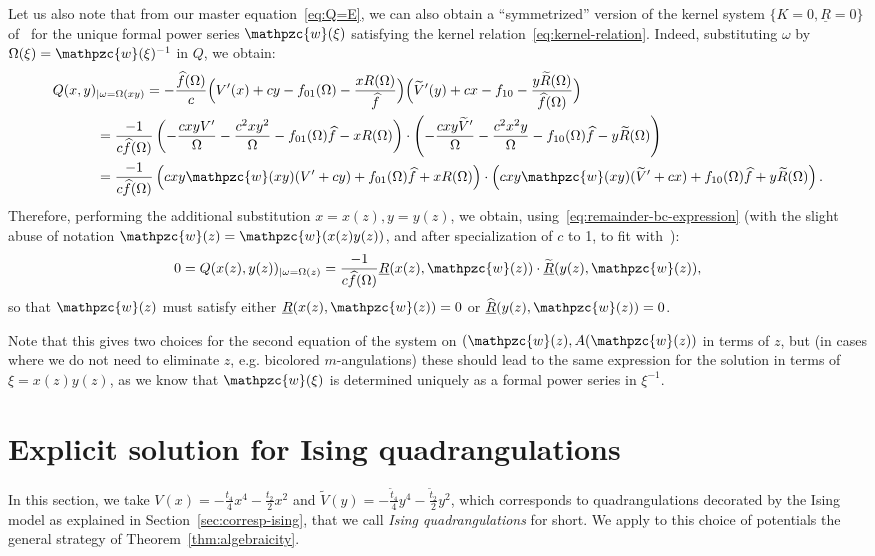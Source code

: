 \documentclass{scrartcl}
\newcommand\wt[1]{\widetilde{#1}}
\newcommand\wh[1]{\widehat{#1}}
\newcommand\ul[1]{\underline{#1}}
\begin{document}
Let us also note that from our master equation~\eqref{eq:Q=E}, we can also obtain a ``symmetrized'' version of the kernel system $\{K=0,\ul R=0\}$ of~\cite{bouttier-carrance} for the unique formal power series $\mathpzc{w}(\xi)$ satisfying the kernel relation~\eqref{eq:kernel-relation}. Indeed, substituting $\omega$ by $\Omega(\xi)=\mathpzc{w}(\xi)^{-1}$ in $Q$, we obtain:
\begin{align*}
Q(x,y)&_{\lvert \omega=\Omega(xy)}=-\frac{\wh{f}(\Omega)}{c}\Big(V'(x)+cy-f_{01}(\Omega)-\frac{xR(\Omega)}{\widehat{f}}\Big)\Big(\widetilde{V}'(y)+cx -f_{10}-\frac{y\widetilde{R}(\Omega)}{\widehat{f}(\Omega)}\Big)\\
&=\frac{-1}{c\wh{f}(\Omega)}\left(-\frac{cxyV'}{\Omega}-\frac{c^2xy^2}{\Omega}-f_{01}(\Omega)\wh{f} - xR(\Omega)\right)\cdot\left(-\frac{cxy\wt V'}{\Omega}-\frac{c^2x^2y}{\Omega}-f_{10}(\Omega)\wh{f} - y\wt R(\Omega)\right)\\
&=\frac{-1}{c\wh{f}(\Omega)}\left(cxy\mathpzc{w}(xy)(V'+cy)+f_{01}(\Omega)\wh{f}+ xR(\Omega)\right)\cdot \left(cxy\mathpzc{w}(xy)(\wt V'+cx)+f_{10}(\Omega)\wh{f}+ y\wt R(\Omega)\right).
\end{align*}
Therefore, performing the additional substitution $x=x(z), y=y(z)$, we obtain, using~\eqref{eq:remainder-bc-expression} (with the slight abuse of notation $\mathpzc{w}(z)=\mathpzc{w}(x(z)y(z))$, and after specialization of $c$ to 1, to fit with~\cite{bouttier-carrance}):
\[
0=Q(x(z),y(z))_{\lvert \omega=\Omega(z)}=\frac{-1}{c\wh{f}(\Omega)}\ul R(x(z),\mathpzc{w}(z))\cdot\wt{\ul R}(y(z),\mathpzc{w}(z)),
\]
so that $\mathpzc{w}(z)$ must satisfy either $\ul R(x(z),\mathpzc{w}(z))=0$ or $\wh{\ul R}(y(z),\mathpzc{w}(z))=0$.

Note that this gives two choices for the second equation of the system on $(\mathpzc{w}(z), A(\mathpzc{w}(z))$ in terms of $z$, but (in cases where we do not need to eliminate $z$, e.g. bicolored $m$-angulations) these should lead to the same expression for the solution in terms of $\xi=x(z)y(z)$, as we know that $\mathpzc{w}(\xi)$ is determined uniquely as a formal power series in $\xi^{-1}$.

\section{Explicit solution for Ising quadrangulations}
\label{sec:ising-quad}

In this section, we take $V(x) = -\frac{t_4}{4}x^4 - \frac{t_2}{2}x^2$ and $\widetilde{V}(y) =- \frac{\widetilde{t}_4}{4}y^4 - \frac{\widetilde{t}_2}{2}y^2$, which corresponds to quadrangulations decorated by the Ising model as explained in Section~\ref{sec:corresp-ising}, that we call \emph{Ising quadrangulations} for short. We apply to this choice of potentials the general strategy of Theorem~\ref{thm:algebraicity}.
\end{document}

